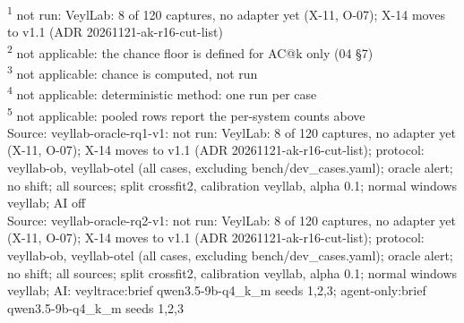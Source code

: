 \begin{table}[t]
\begin{tabular}{lllllllllllllllllllll}
\hline
\end{tabular}
\par\smallskip\footnotesize
\textsuperscript{1} not run: VeylLab: 8 of 120 captures, no adapter yet (X-11, O-07); X-14 moves to v1.1 (ADR 20261121-ak-r16-cut-list)\\
\textsuperscript{2} not applicable: the chance floor is defined for AC@k only (04 \S{}7)\\
\textsuperscript{3} not applicable: chance is computed, not run\\
\textsuperscript{4} not applicable: deterministic method: one run per case\\
\textsuperscript{5} not applicable: pooled rows report the per-system counts above\\
Source: veyllab-oracle-rq1-v1: not run: VeylLab: 8 of 120 captures, no adapter yet (X-11, O-07); X-14 moves to v1.1 (ADR 20261121-ak-r16-cut-list); protocol: veyllab-ob, veyllab-otel (all cases, excluding bench/dev\_cases.yaml); oracle alert; no shift; all sources; split crossfit2, calibration veyllab, alpha 0.1; normal windows veyllab; AI off\\
Source: veyllab-oracle-rq2-v1: not run: VeylLab: 8 of 120 captures, no adapter yet (X-11, O-07); X-14 moves to v1.1 (ADR 20261121-ak-r16-cut-list); protocol: veyllab-ob, veyllab-otel (all cases, excluding bench/dev\_cases.yaml); oracle alert; no shift; all sources; split crossfit2, calibration veyllab, alpha 0.1; normal windows veyllab; AI: veyltrace:brief qwen3.5-9b-q4\_k\_m seeds 1,2,3; agent-only:brief qwen3.5-9b-q4\_k\_m seeds 1,2,3\\
\end{table}
